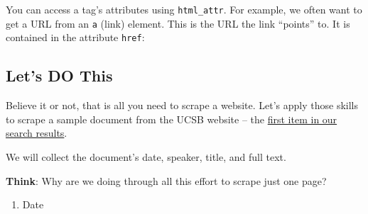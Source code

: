\documentclass[
]{book}
\newenvironment{Shaded}{\begin{snugshade}}{\end{snugshade}}
\newcommand{\CommentTok}[1]{\textcolor[rgb]{0.56,0.35,0.01}{\textit{#1}}}
\newcommand{\KeywordTok}[1]{\textcolor[rgb]{0.13,0.29,0.53}{\textbf{#1}}}
\newcommand{\NormalTok}[1]{#1}
\newcommand{\OperatorTok}[1]{\textcolor[rgb]{0.81,0.36,0.00}{\textbf{#1}}}
\newcommand{\StringTok}[1]{\textcolor[rgb]{0.31,0.60,0.02}{#1}}
\providecommand{\tightlist}{%
  \setlength{\itemsep}{0pt}\setlength{\parskip}{0pt}}
\begin{document}
You can access a tag's attributes using \texttt{html\_attr}. For example, we often want to get a URL from an \texttt{a} (link) element. This is the URL the link ``points'' to. It is contained in the attribute \texttt{href}:

\begin{Shaded}
\end{Shaded}

\hypertarget{lets-do-this}{%
\subsection{Let's DO This}\label{lets-do-this}}

Believe it or not, that is all you need to scrape a website. Let's apply those skills to scrape a sample document from the UCSB website -- the \href{\%22http://www.presidency.ucsb.edu/documents/letter-t-keith-glennan-administrator-national-aeronautics-and-space-administration\%22}{first item in our search results}.

We will collect the document's date, speaker, title, and full text.

\textbf{Think}: Why are we doing through all this effort to scrape just one page?

\begin{enumerate}
\def\labelenumi{\arabic{enumi}.}
\tightlist
\item
  Date
\end{enumerate}

\begin{Shaded}
\end{Shaded}
\end{document}
